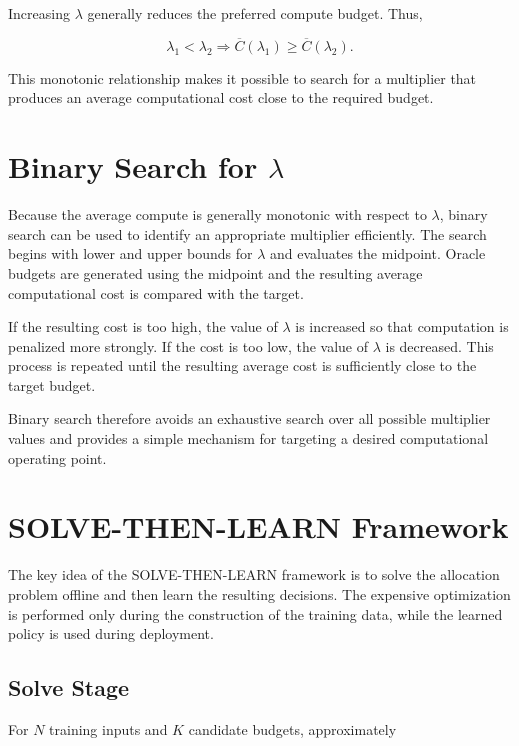 \documentclass[12pt,a4paper,titlepage]{report}
\begin{document}
Increasing $\lambda$ generally reduces the preferred compute budget. Thus,

\begin{equation}
\lambda_1<\lambda_2
\Rightarrow
\overline{C}(\lambda_1)
\geq
\overline{C}(\lambda_2).
\end{equation}

This monotonic relationship makes it possible to search for a multiplier that produces an average computational cost close to the required budget.

\section{Binary Search for $\lambda$}

Because the average compute is generally monotonic with respect to $\lambda$, binary search can be used to identify an appropriate multiplier efficiently. The search begins with lower and upper bounds for $\lambda$ and evaluates the midpoint. Oracle budgets are generated using the midpoint and the resulting average computational cost is compared with the target.

If the resulting cost is too high, the value of $\lambda$ is increased so that computation is penalized more strongly. If the cost is too low, the value of $\lambda$ is decreased. This process is repeated until the resulting average cost is sufficiently close to the target budget.

Binary search therefore avoids an exhaustive search over all possible multiplier values and provides a simple mechanism for targeting a desired computational operating point.

\section{SOLVE-THEN-LEARN Framework}

The key idea of the SOLVE-THEN-LEARN framework is to solve the allocation problem offline and then learn the resulting decisions. The expensive optimization is performed only during the construction of the training data, while the learned policy is used during deployment.

\subsection{Solve Stage}

For $N$ training inputs and $K$ candidate budgets, approximately
\end{document}
